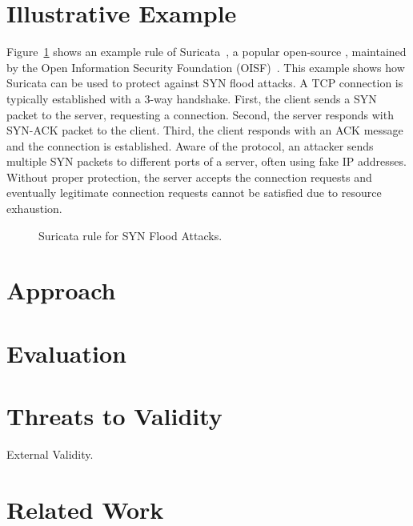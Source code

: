 \documentclass[conference]{IEEEtran}
\begin{document}
\section{Illustrative Example}
\label{sec:suri-metas-coverage}

Figure~\ref{fig:synflood-example} shows an
example rule of Suricata~\cite{suricata}, a popular open-source
\nids{}, maintained by the Open Information Security Foundation
(OISF)~\cite{oisf}. This example shows how Suricata can be used to
protect against SYN flood attacks. A TCP connection is typically
established with a 3-way handshake. First, the client sends a SYN
packet to the server, requesting a connection. Second, the server
responds with SYN-ACK packet to the client. Third, the client responds
with an ACK message and the connection is established. Aware of the
protocol, an attacker sends multiple SYN packets to different ports of
a server, often using fake IP addresses. Without proper protection,
the server accepts the connection requests and eventually legitimate
connection requests cannot be satisfied due to resource exhaustion.

\begin{figure}[t]
  
  \caption{Suricata rule for SYN Flood Attacks.}
  \label{fig:synflood-example}
\end{figure}


\section{Approach}


\section{Evaluation}


\section{Threats to Validity}

External Validity. 

\section{Related Work}


\balance


\end{document}
